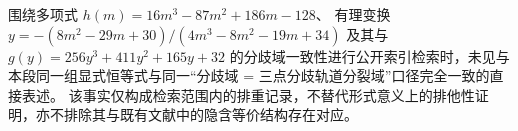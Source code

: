 \begin{remark}[公开检索的同形性排查说明]\label{rem:xi-ed-hm-g-leyang-public-search-note}
围绕多项式 \(h(m)=16m^{3}-87m^{2}+186m-128\)、
有理变换
\(
y=-(8m^{2}-29m+30)/(4m^{3}-8m^{2}-19m+34)
\)
及其与 \(g(y)=256y^{3}+411y^{2}+165y+32\) 的分歧域一致性进行公开索引检索时，未见与本段同一组显式恒等式与同一“分歧域 = 三点分歧轨道分裂域”口径完全一致的直接表述。
该事实仅构成检索范围内的排重记录，不替代形式意义上的排他性证明，亦不排除其与既有文献中的隐含等价结构存在对应。
\end{remark}

\endinput
